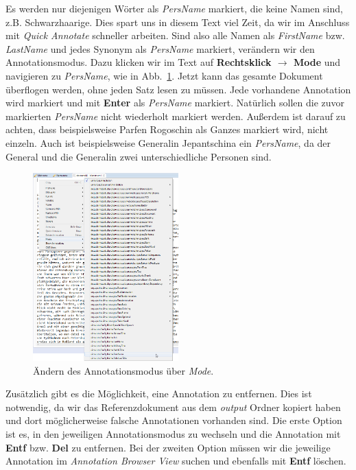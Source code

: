\documentclass{article}
\begin{document}
Es werden nur diejenigen Wörter als \textit{PersName} markiert, die keine Namen sind, z.B. \glqq Schwarzhaarige\grqq{}. Dies spart uns in diesem Text viel Zeit, da wir im Anschluss mit \textit{Quick Annotate} schneller arbeiten. Sind also alle Namen als \textit{FirstName} bzw. \textit{LastName} und jedes Synonym als \textit{PersName} markiert, verändern wir den Annotationsmodus. Dazu klicken wir im Text auf \textbf{Rechtsklick $\rightarrow$ Mode} und navigieren zu \textit{PersName}, wie in Abb.~\ref{mode}. Jetzt kann das gesamte Dokument überflogen werden, ohne jeden Satz lesen zu müssen. Jede vorhandene Annotation wird markiert und mit \textbf{Enter} als \textit{PersName} markiert. Natürlich sollen die zuvor markierten \textit{PersName} nicht wiederholt markiert werden. Außerdem ist darauf zu achten, dass beispielsweise \glqq Parfen Rogoschin\grqq{} als Ganzes markiert wird, nicht einzeln. Auch ist beispielsweise \glqq Generalin Jepantschina\grqq{} ein \textit{PersName}, da der General und die Generalin zwei unterschiedliche Personen sind.

\begin{figure}
\centering
\includegraphics[width=0.5\textwidth]{figs/test_mode.png}
\caption{Ändern des Annotationsmodus über \textit{Mode}.}
\label{mode}
\end{figure}

\newpage

Zusätzlich gibt es die Möglichkeit, eine Annotation zu entfernen. Dies ist notwendig, da wir das Referenzdokument aus dem \textit{output} Ordner kopiert haben und dort möglicherweise falsche Annotationen vorhanden sind. Die erste Option ist es, in den jeweiligen Annotationsmodus zu wechseln und die Annotation mit \textbf{Entf} bzw. \textbf{Del} zu entfernen. Bei der zweiten Option müssen wir die jeweilige Annotation im \textit{Annotation Browser View} suchen und ebenfalls mit \textbf{Entf} löschen.
\end{document}
